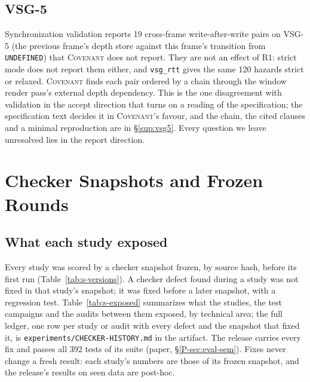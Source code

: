 \documentclass[acmtog,anonymous,review]{acmart}
\newcommand{\sys}{\textsc{Covenant}\xspace}
\newcommand{\code}[1]{\texttt{#1}}
\begin{document}
\subsection{VSG-5}
Synchronization validation reports 19 cross-frame write-after-write pairs on VSG-5 (the previous frame's depth store
against this frame's transition from \code{UNDEFINED}) that \sys does not report. They are not an effect of R1: strict
mode does not report them either, and \code{vsg\_rtt} gives the same 120 hazards strict or relaxed. \sys finds each
pair ordered by a chain through the window render pass's external depth dependency. This is the one disagreement with
validation in the accept direction that turns on a reading of the specification; the specification text decides it in \sys's favour, and the chain, the cited
clauses and a minimal reproduction are in \S\ref{sup:vsg5}. Every question we leave unresolved lies in the report
direction.

\section{Checker Snapshots and Frozen Rounds}
\label{sup:history}

\subsection{What each study exposed}
Every study was scored by a checker snapshot frozen, by source hash, before its first run (Table~\ref{tab:s-versions}).
A checker defect found during a study was not fixed in that study's snapshot; it was fixed before a later snapshot,
with a regression test. Table~\ref{tab:s-exposed} summarizes what the studies, the test campaigns and the audits
between them exposed, by technical area; the full ledger, one row per study or audit with every defect and the
snapshot that fixed it, is \code{experiments/CHECKER-HISTORY.md} in the artifact. The release carries every fix and
passes all 392 tests of its suite (paper, \S\ref{P-sec:eval-sem}). Fixes never change a fresh result: each study's
numbers are those of its frozen snapshot, and the release's results on seen data are post-hoc.
\end{document}
